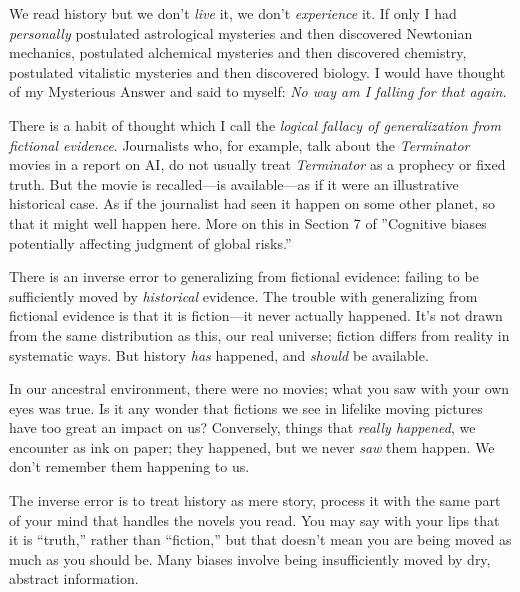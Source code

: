 {
 We read history but we don't \textit{live} it, we
don't \textit{experience} it. If only I had
\textit{personally} postulated astrological mysteries and then
discovered Newtonian mechanics, postulated alchemical mysteries and
then discovered chemistry, postulated vitalistic mysteries and then
discovered biology. I would have thought of my Mysterious Answer and
said to myself: \textit{No way am I falling for that again.}}

\myendsectiontext


{
 There is a habit of thought which I call the \textit{logical
fallacy of generalization from fictional evidence}. Journalists who,
for example, talk about the \textit{Terminator} movies in a report on
AI, do not usually treat \textit{Terminator} as a prophecy or fixed
truth. But the movie is recalled---is available{}---as if it were an
illustrative historical case. As if the journalist had seen it happen
on some other planet, so that it might well happen here. More on this
in Section 7 of ''Cognitive biases potentially
affecting judgment of global
risks.'' }

{
 There is an inverse error to generalizing from fictional evidence:
failing to be sufficiently moved by \textit{historical} evidence. The
trouble with generalizing from fictional evidence is that it is
fiction---it never actually happened. It's not drawn
from the same distribution as this, our real universe; fiction differs
from reality in systematic ways. But history \textit{has} happened, and
\textit{should} be available.}

{
 In our ancestral environment, there were no movies; what you saw
with your own eyes was true. Is it any wonder that fictions we see in
lifelike moving pictures have too great an impact on us? Conversely,
things that \textit{really happened}, we encounter as ink on paper;
they happened, but we never \textit{saw} them happen. We
don't remember them happening to us.}

{
 The inverse error is to treat history as mere story, process it
with the same part of your mind that handles the novels you read. You
may say with your lips that it is
``truth,'' rather than
``fiction,'' but that
doesn't mean you are being moved as much as you should
be. Many biases involve being insufficiently moved by dry, abstract
information.}

